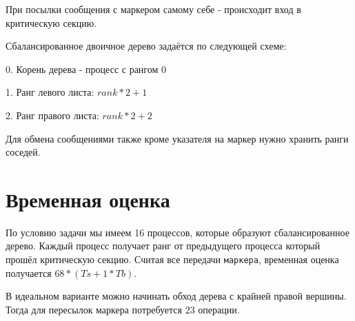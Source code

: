 \documentclass[12pt, oneside, a4paper]{article}
\begin{document}
При посылки сообщения с маркером самому себе - происходит вход в критическую секцию.

Сбалансированное двоичное дерево задаётся по следующей схеме:

0. Корень дерева - процесс с рангом 0

1. Ранг левого листа: $rank * 2 + 1$

2. Ранг правого листа: $rank * 2 + 2$

Для обмена сообщениями также кроме указателя на маркер нужно хранить ранги соседей. 

\section{Временная оценка}

По условию задачи мы имеем 16 процессов, которые образуют сбалансированное дерево. Каждый процесс получает ранг от предыдущего процесса который прошёл критическую секцию. Считая все передачи \texttt{маркера}, временная оценка получается $68*(Ts+1*Tb)$.

В идеальном варианте можно начинать обход дерева с крайней правой вершины. Тогда для пересылок маркера потребуется 23 операции.

\vspace{1200pt}
\end{document}
